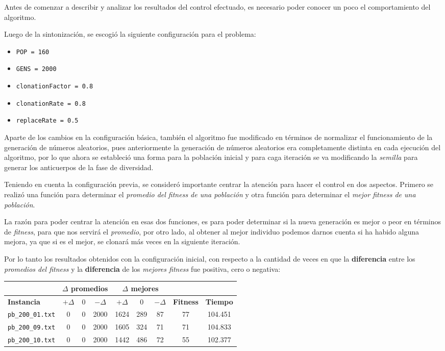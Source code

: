 Antes de comenzar a describir y analizar los resultados del control efectuado,
es necesario poder conocer un poco el comportamiento del algoritmo.

Luego de la sintonización, se escogió la siguiente configuración para el problema:

\begin{itemize}
    \item \texttt{POP = 160}
    \item \texttt{GENS = 2000}
    \item \texttt{clonationFactor = 0.8}
    \item \texttt{clonationRate = 0.8}
    \item \texttt{replaceRate = 0.5}
\end{itemize}

Aparte de los cambios en la configuración básica, también el algoritmo fue modificado
en términos de normalizar el funcionamiento de la generación de números aleatorios,
pues anteriormente la generación de números aleatorios era completamente distinta en
cada ejecución del algoritmo, por lo que ahora se estableció una forma para la población
inicial y para caga iteración se va modificando la \emph{semilla} para generar
los anticuerpos de la fase de diversidad.

Teniendo en cuenta la configuración previa, se consideró importante centrar la atención
para hacer el control en dos aspectos. Primero se realizó una función para determinar
el \emph{promedio del fitness de una población} y otra función para determinar el
\emph{mejor fitness de una población}.

La razón para poder centrar la atención en esas dos funciones, es para poder
determinar si la nueva generación es mejor o peor en términos de \emph{fitness},
para que nos servirá el \emph{promedio}, por otro lado, al obtener al mejor individuo
podemos darnos cuenta si ha habido alguna mejora, ya que si es el mejor, se clonará
más veces en la siguiente iteración.

Por lo tanto los resultados obtenidos con la configuración inicial, con respecto a la
cantidad de veces en que la \textbf{diferencia} entre los \emph{promedios del fitness} y la \textbf{diferencia}
de los \emph{mejores fitness} fue positiva, cero o negativa:


\begin{center}
\begin{tabular}{|l|c|c|c|c|c|c|c|c|}
\hline
  & \multicolumn{3}{|c|}{\textbf{$\Delta$ promedios}} & \multicolumn{3}{|c|}{\textbf{$\Delta$ mejores}} & & \\\hline
\textbf{Instancia} & $+\Delta$ & $0$ & $-\Delta$ & $+\Delta$ & $0$ & $-\Delta$ & \textbf{Fitness} & \textbf{Tiempo} \\\hline
\texttt{pb\_200\_01.txt} & 0 & 0 & 2000 & 1624 & 289 & 87 & 77 & 104.451 \\\hline
\texttt{pb\_200\_09.txt} & 0 & 0 & 2000 & 1605 & 324 & 71 & 71 & 104.833 \\\hline
\texttt{pb\_200\_10.txt} & 0 & 0 & 2000 & 1442 & 486 & 72 & 55 & 102.377 \\\hline
\end{tabular}
\end{center}

